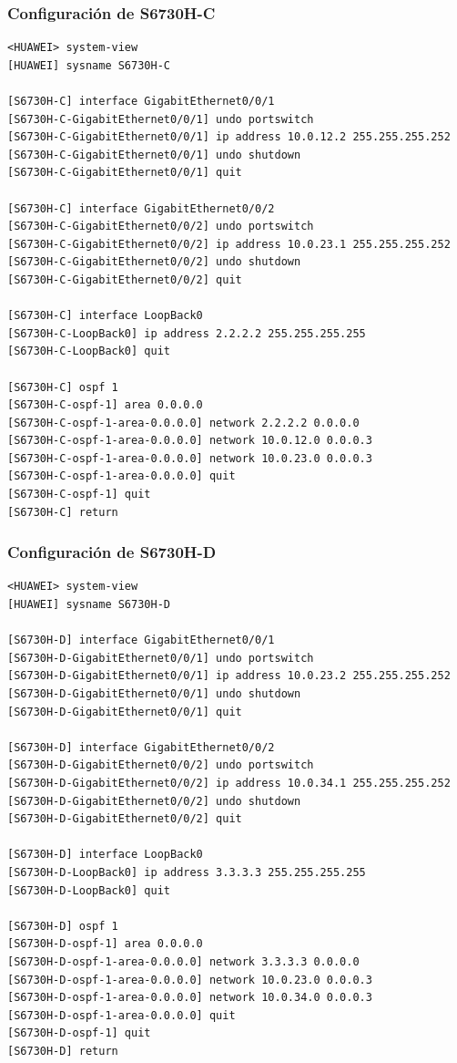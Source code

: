\subsubsection{Configuración de S6730H-C}

\begin{lstlisting}[style=terminal]
<HUAWEI> system-view
[HUAWEI] sysname S6730H-C

[S6730H-C] interface GigabitEthernet0/0/1
[S6730H-C-GigabitEthernet0/0/1] undo portswitch
[S6730H-C-GigabitEthernet0/0/1] ip address 10.0.12.2 255.255.255.252
[S6730H-C-GigabitEthernet0/0/1] undo shutdown
[S6730H-C-GigabitEthernet0/0/1] quit

[S6730H-C] interface GigabitEthernet0/0/2
[S6730H-C-GigabitEthernet0/0/2] undo portswitch
[S6730H-C-GigabitEthernet0/0/2] ip address 10.0.23.1 255.255.255.252
[S6730H-C-GigabitEthernet0/0/2] undo shutdown
[S6730H-C-GigabitEthernet0/0/2] quit

[S6730H-C] interface LoopBack0
[S6730H-C-LoopBack0] ip address 2.2.2.2 255.255.255.255
[S6730H-C-LoopBack0] quit

[S6730H-C] ospf 1
[S6730H-C-ospf-1] area 0.0.0.0
[S6730H-C-ospf-1-area-0.0.0.0] network 2.2.2.2 0.0.0.0
[S6730H-C-ospf-1-area-0.0.0.0] network 10.0.12.0 0.0.0.3
[S6730H-C-ospf-1-area-0.0.0.0] network 10.0.23.0 0.0.0.3
[S6730H-C-ospf-1-area-0.0.0.0] quit
[S6730H-C-ospf-1] quit
[S6730H-C] return
\end{lstlisting}

\subsubsection{Configuración de S6730H-D}

\begin{lstlisting}[style=terminal]
<HUAWEI> system-view
[HUAWEI] sysname S6730H-D

[S6730H-D] interface GigabitEthernet0/0/1
[S6730H-D-GigabitEthernet0/0/1] undo portswitch
[S6730H-D-GigabitEthernet0/0/1] ip address 10.0.23.2 255.255.255.252
[S6730H-D-GigabitEthernet0/0/1] undo shutdown
[S6730H-D-GigabitEthernet0/0/1] quit

[S6730H-D] interface GigabitEthernet0/0/2
[S6730H-D-GigabitEthernet0/0/2] undo portswitch
[S6730H-D-GigabitEthernet0/0/2] ip address 10.0.34.1 255.255.255.252
[S6730H-D-GigabitEthernet0/0/2] undo shutdown
[S6730H-D-GigabitEthernet0/0/2] quit

[S6730H-D] interface LoopBack0
[S6730H-D-LoopBack0] ip address 3.3.3.3 255.255.255.255
[S6730H-D-LoopBack0] quit

[S6730H-D] ospf 1
[S6730H-D-ospf-1] area 0.0.0.0
[S6730H-D-ospf-1-area-0.0.0.0] network 3.3.3.3 0.0.0.0
[S6730H-D-ospf-1-area-0.0.0.0] network 10.0.23.0 0.0.0.3
[S6730H-D-ospf-1-area-0.0.0.0] network 10.0.34.0 0.0.0.3
[S6730H-D-ospf-1-area-0.0.0.0] quit
[S6730H-D-ospf-1] quit
[S6730H-D] return
\end{lstlisting}

